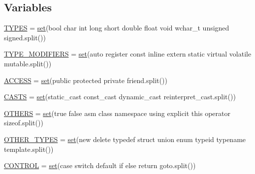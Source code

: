 \subsection*{Variables}
\begin{DoxyCompactItemize}
\item 
\hyperlink{namespacecpp_1_1keywords_a56fd5baf357970548e1ec366edfc2c13}{T\+Y\+P\+ES} = \hyperlink{vendor_2googletest_2googlemock_2CMakeLists_8txt_aa99cc432a5064db15e7653de9d85d2d2}{set}(\textquotesingle{}bool char int long short double float void wchar\+\_\+t unsigned signed\textquotesingle{}.split())
\item 
\hyperlink{namespacecpp_1_1keywords_af9282ce418d6b4b43dca5ed574caedd7}{T\+Y\+P\+E\+\_\+\+M\+O\+D\+I\+F\+I\+E\+RS} = \hyperlink{vendor_2googletest_2googlemock_2CMakeLists_8txt_aa99cc432a5064db15e7653de9d85d2d2}{set}(\textquotesingle{}auto register const inline extern static virtual volatile mutable\textquotesingle{}.split())
\item 
\hyperlink{namespacecpp_1_1keywords_a786f41bbea982641425c819d10bb2064}{A\+C\+C\+E\+SS} = \hyperlink{vendor_2googletest_2googlemock_2CMakeLists_8txt_aa99cc432a5064db15e7653de9d85d2d2}{set}(\textquotesingle{}public protected private friend\textquotesingle{}.split())
\item 
\hyperlink{namespacecpp_1_1keywords_aeba38dc38e188040f4ec44ba05092e7f}{C\+A\+S\+TS} = \hyperlink{vendor_2googletest_2googlemock_2CMakeLists_8txt_aa99cc432a5064db15e7653de9d85d2d2}{set}(\textquotesingle{}static\+\_\+cast const\+\_\+cast dynamic\+\_\+cast reinterpret\+\_\+cast\textquotesingle{}.split())
\item 
\hyperlink{namespacecpp_1_1keywords_a15fe231fbad145538b73892804898809}{O\+T\+H\+E\+RS} = \hyperlink{vendor_2googletest_2googlemock_2CMakeLists_8txt_aa99cc432a5064db15e7653de9d85d2d2}{set}(\textquotesingle{}true false asm class namespace using explicit this operator sizeof\textquotesingle{}.split())
\item 
\hyperlink{namespacecpp_1_1keywords_aa86a5e35a3ace14022a5ca1b91baf207}{O\+T\+H\+E\+R\+\_\+\+T\+Y\+P\+ES} = \hyperlink{vendor_2googletest_2googlemock_2CMakeLists_8txt_aa99cc432a5064db15e7653de9d85d2d2}{set}(\textquotesingle{}new delete typedef struct union enum typeid typename template\textquotesingle{}.split())
\item 
\hyperlink{namespacecpp_1_1keywords_a374dfe9c96681079802ba4724287b8ff}{C\+O\+N\+T\+R\+OL} = \hyperlink{vendor_2googletest_2googlemock_2CMakeLists_8txt_aa99cc432a5064db15e7653de9d85d2d2}{set}(\textquotesingle{}case switch default if else return goto\textquotesingle{}.split())

\end{DoxyCompactItemize}

